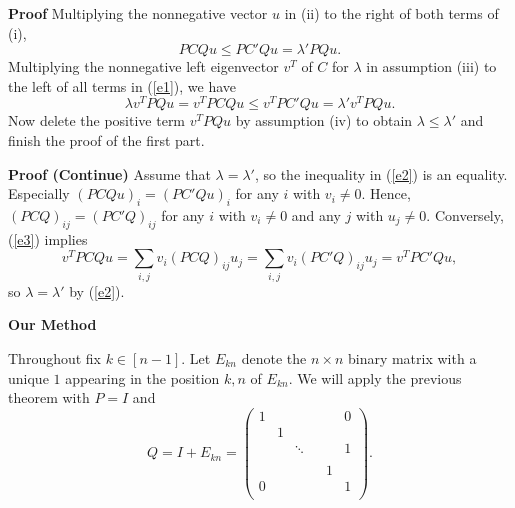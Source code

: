 \documentclass{beamer}
\theoremstyle{plain}
\theoremstyle{definition}
\begin{document}
\begin{frame}{\bf Proof}
            Multiplying the nonnegative vector $u$ in (ii) to the right of both terms of  (i),
        \begin{equation}
            \label{e1}
            PCQu\leq PC'Qu=\lambda'PQu.
        \end{equation}
        Multiplying the nonnegative left eigenvector $v^T$ of $C$ for $\lambda$ in assumption (iii) to the left of all terms  in (\ref{e1}), we have
        \begin{equation}
            \label{e2}
            \lambda v^TPQu=v^TPCQu\leq v^TPC'Qu=\lambda' v^TPQu.
        \end{equation}
        Now delete the positive term $v^TPQu$ by assumption (iv) to obtain $\lambda\leq \lambda'$ and finish the proof of the first part.
\end{frame}

\begin{frame}{\bf Proof (Continue)}
        Assume that $\lambda=\lambda'$, so the inequality in (\ref{e2}) is an equality.  Especially $(PCQu)_i=(PC'Qu)_i$ for any $i$ with $v_i\not=0.$ Hence, $(PCQ)_{ij}=(PC'Q)_{ij}$ for any $i$ with $v_i\not=0$ and any $j$ with $u_j\not=0.$
         Conversely, (\ref{e3}) implies $$v^TPCQu=\sum_{i,j} v_i(PCQ)_{ij}u_j=\sum_{i,j} v_i(PC'Q)_{ij}u_j=v^TPC'Qu,$$ so
            $\lambda=\lambda'$ by (\ref{e2}).
\end{frame}

\begin{frame}{\bf Our Method}


 Throughout fix $k\in [n-1]$. Let $E_{kn}$ denote the $n\times n$ binary matrix with a unique $1$ appearing in the  position $k,n$ of $E_{kn}$. We will apply the previous theorem with $P=I$ and $$Q=I+E_{kn}=\begin{pmatrix}
1 &  & & &  & 0 \\
 & 1 &  &      &  &  \\
 &  & \ddots & &  & 1 \\
 &  &        & &  &  \\
  &  & & & 1 &  \\
0 &  & & &  & 1 \\
\end{pmatrix}.$$

\end{frame}
\end{document}
